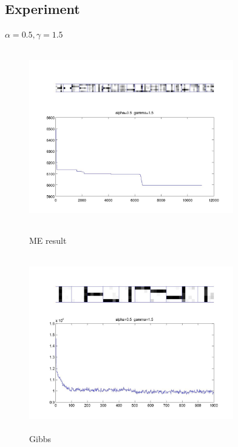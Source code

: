 \documentclass{article}
\begin{document}
\begin{spacing}{1.1}
\subsection{Experiment}
$\alpha=0.5,\gamma=1.5$\\
\begin{figure}[h] 
  \begin{minipage}[b]{0.5\textwidth} 
    \centering 
    \includegraphics[width=3.5in,height=3in]{exp_me1.jpg} 
    \caption{ME result} 
    \label{fig:by:table} 
  \end{minipage}%
  \begin{minipage}[b]{0.5\textwidth} 
    \centering 
    \includegraphics[width=3.5in,height=3in]{exp_gib.jpg} 
    \caption{Gibbs}
    \label{fig:by:table}  
   \end{minipage}%
\end{figure}


\end{spacing}
\end{document}

